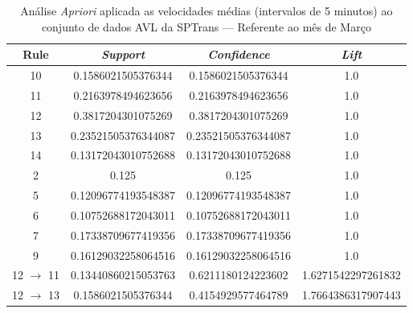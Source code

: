 \documentclass[
	12pt,				%
	oneside,			%
	a4paper,			%
	english,			%
	brazil				%
	]{abntex2ppgsi}
\begin{document}
\begin{apendicesenv}
\begin{table}[!htb]
\centering
\caption {Análise \textit{Apriori} aplicada as velocidades médias (intervalos de 5 minutos) ao conjunto de dados AVL da SPTrans --- Referente ao mês de Março}
\label {tab:aprioriMarch}
\begin{tabular}{c|c|c|c}
\hline
\textbf{Rule} & \textit{\textbf{Support}} & \textit{\textbf{Confidence}} & \textit{\textbf{Lift}} \\
\hline 
10 &  0.1586021505376344 &  0.1586021505376344 &  1.0\\ 
\hline 
11 &  0.2163978494623656 &  0.2163978494623656 &  1.0\\ 
\hline 
12 &  0.3817204301075269 &  0.3817204301075269 &  1.0\\ 
\hline 
13 &  0.23521505376344087 &  0.23521505376344087 &  1.0\\ 
\hline 
14 &  0.13172043010752688 &  0.13172043010752688 &  1.0\\ 
\hline 
2 &  0.125 &  0.125 &  1.0\\ 
\hline 
5 &  0.12096774193548387 &  0.12096774193548387 &  1.0\\ 
\hline 
6 &  0.10752688172043011 &  0.10752688172043011 &  1.0\\ 
\hline 
7 &  0.17338709677419356 &  0.17338709677419356 &  1.0\\ 
\hline 
9 &  0.16129032258064516 &  0.16129032258064516 &  1.0\\ 
\hline 
12 $\rightarrow$ 11 &  0.13440860215053763 &  0.6211180124223602 &  1.6271542297261832\\ 
\hline 
12 $\rightarrow$ 13 &  0.1586021505376344 &  0.4154929577464789 &  1.7664386317907443\\
\hline
\end{tabular}
\end{table}



\end{apendicesenv}
\end{document}

